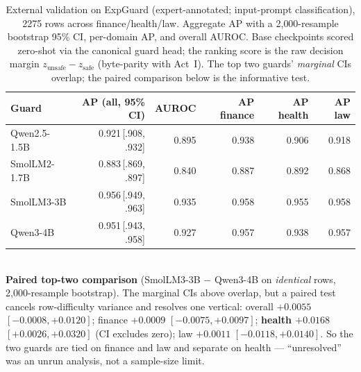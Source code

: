 \begin{table}[H]\centering\footnotesize
\caption{External validation on ExpGuard (expert-annotated; input-prompt classification), 2275 rows across finance/health/law. Aggregate AP with a 2{,}000-resample bootstrap 95\% CI, per-domain AP, and overall AUROC. Base checkpoints scored zero-shot via the canonical guard head; the ranking score is the raw decision margin $z_{\text{unsafe}}-z_{\text{safe}}$ (byte-parity with Act~I). The top two guards' \emph{marginal} CIs overlap; the paired comparison below is the informative test.}
\label{tab:expguard}
\begin{tabular}{lrrrrr}\toprule
Guard & AP (all, 95\% CI) & AUROC & AP finance & AP health & AP law \\
\midrule
Qwen2.5-1.5B & 0.921\,[.908, .932] & 0.895 & 0.938 & 0.906 & 0.918 \\
SmolLM2-1.7B & 0.883\,[.869, .897] & 0.840 & 0.887 & 0.892 & 0.868 \\
SmolLM3-3B & 0.956\,[.949, .963] & 0.935 & 0.958 & 0.955 & 0.958 \\
Qwen3-4B & 0.951\,[.943, .958] & 0.927 & 0.957 & 0.938 & 0.957 \\
\bottomrule
\end{tabular}\\[3pt]{\footnotesize \textbf{Paired top-two comparison} (SmolLM3-3B $-$ Qwen3-4B on \emph{identical} rows, 2{,}000-resample bootstrap). The marginal CIs above overlap, but a paired test cancels row-difficulty variance and resolves one vertical: overall $+0.0055$ $[-0.0008, +0.0120]$; finance $+0.0009$ $[-0.0075, +0.0097]$; \textbf{health $+0.0168$ $[+0.0026, +0.0320]$} (CI excludes zero); law $+0.0011$ $[-0.0118, +0.0140]$. So the two guards are tied on finance and law and separate on health --- ``unresolved'' was an unrun analysis, not a sample-size limit.}
\end{table}
